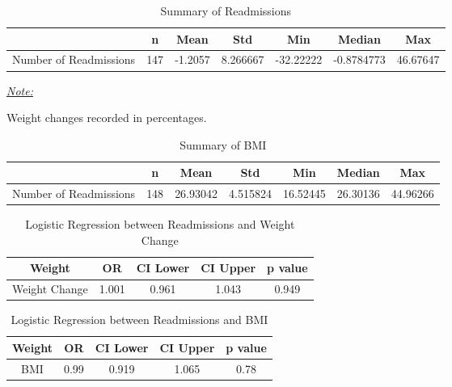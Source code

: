 \documentclass[12pt,]{article}
\begin{document}
\begin{table}[!h]

\caption{\label{tab:unnamed-chunk-29}Summary of Readmissions}
\centering
\begin{threeparttable}
\begin{tabular}{>{\raggedright\arraybackslash}p{5cm}cccccc}
\toprule
  & n & Mean & Std & Min & Median & Max\\
\midrule
\rowcolor{white}  Number of Readmissions & 147 & -1.2057 & 8.266667 & -32.22222 & -0.8784773 & 46.67647\\
\bottomrule
\end{tabular}
\begin{tablenotes}[para]
\item \underline{\textit{Note:}} 
\item Weight changes recorded in percentages.
\end{tablenotes}
\end{threeparttable}
\end{table}

\begin{table}[!h]

\caption{\label{tab:unnamed-chunk-29}Summary of BMI}
\centering
\begin{tabular}{>{\raggedright\arraybackslash}p{5cm}cccccc}
\toprule
  & n & Mean & Std & Min & Median & Max\\
\midrule
\rowcolor{white}  Number of Readmissions & 148 & 26.93042 & 4.515824 & 16.52445 & 26.30136 & 44.96266\\
\bottomrule
\end{tabular}
\end{table}

\begin{table}[!h]

\caption{\label{tab:unnamed-chunk-29}Logistic Regression between Readmissions and Weight Change}
\centering
\begin{tabular}{ccccc}
\toprule
Weight & OR & CI Lower & CI Upper & p value\\
\midrule
\rowcolor{white}  Weight Change & 1.001 & 0.961 & 1.043 & 0.949\\
\bottomrule
\end{tabular}
\end{table}

\begin{table}[!h]

\caption{\label{tab:unnamed-chunk-29}Logistic Regression between Readmissions and BMI}
\centering
\begin{tabular}{ccccc}
\toprule
Weight & OR & CI Lower & CI Upper & p value\\
\midrule
\rowcolor{white}  BMI & 0.99 & 0.919 & 1.065 & 0.78\\
\bottomrule
\end{tabular}
\end{table}
\end{document}
